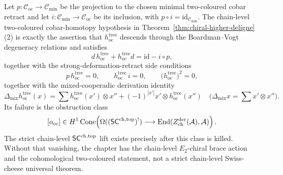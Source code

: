 \begin{proposition}%
\label{prop:chd-two-coloured-cobar-obstruction}%
%
Let \(p\colon\mathcal C_{\mathrm{oc}}\to\mathcal C_{\mathrm{min}}\)
be the projection to the chosen minimal two-coloured cobar retract and
let \(i\colon\mathcal C_{\mathrm{min}}\to\mathcal C_{\mathrm{oc}}\)
be its inclusion, with \(p\circ i=\mathrm{id}_{\mathcal C_{\mathrm{min}}}\).
The chain-level two-coloured cobar-homotopy
hypothesis in Theorem~\ref{thm:chiral-higher-deligne}(2) is exactly
the assertion that \(h_{\mathrm{oc}}^{\mathrm{tree}}\) descends through
the Boardman--Vogt degeneracy relations and satisfies
\begin{equation}\label{eq:chd-hoc-contraction}
 d\,h_{\mathrm{oc}}^{\mathrm{tree}}
 +h_{\mathrm{oc}}^{\mathrm{tree}}d
 =
 \mathrm{id}-i\circ p,
\end{equation}
together with the strong-deformation-retract side conditions
\begin{equation}\label{eq:chd-hoc-side-conditions}
 p\,h_{\mathrm{oc}}^{\mathrm{tree}}=0,\qquad
 h_{\mathrm{oc}}^{\mathrm{tree}}\,i=0,\qquad
 \bigl(h_{\mathrm{oc}}^{\mathrm{tree}}\bigr)^2=0,
\end{equation}
together with the mixed-cooperadic derivation identity
\begin{equation}\label{eq:chd-hoc-delta-mix}
 \Delta_{\mathrm{mix}}h_{\mathrm{oc}}^{\mathrm{tree}}(x)
 =
 \sum h_{\mathrm{oc}}^{\mathrm{tree}}(x')\otimes x''
 +(-1)^{|x'|}x'\otimes h_{\mathrm{oc}}^{\mathrm{tree}}(x'')
 \quad
 \bigl(\Delta_{\mathrm{mix}}x=\sum x'\otimes x''\bigr).
\end{equation}
Its failure is the obstruction class
\begin{equation}\label{eq:chd-oc-obstruction-class}
 [o_{\mathrm{oc}}]\in
 H^{1}\operatorname{Cone}\!\left(
 \Omega((\mathsf{SC}^{\mathrm{ch},\mathrm{top}})^!)
 \longrightarrow
 \mathrm{End}(Z^{\mathrm{der}}_{\mathrm{ch}}(\mathcal{A}),\mathcal{A})
 \right).
\end{equation}
The strict chain-level \(\mathsf{SC}^{\mathrm{ch},\mathrm{top}}\) lift exists precisely after this
class is killed. Without that vanishing, the chapter has the
chain-level \(E_2\)-chiral brace action and the cohomological
two-coloured statement, not a strict chain-level Swiss-cheese
universal theorem.
\end{proposition}

